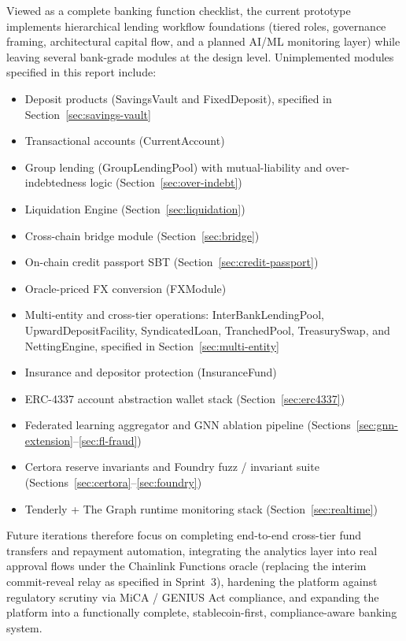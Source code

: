 \documentclass[12pt,a4paper]{report}
\begin{document}
Viewed as a complete banking function checklist, the current prototype implements hierarchical lending workflow foundations (tiered roles, governance framing, architectural capital flow, and a planned AI/ML monitoring layer) while leaving several bank-grade modules at the design level. Unimplemented modules specified in this report include:
\begin{itemize}[noitemsep]
\item Deposit products (SavingsVault and FixedDeposit), specified in Section~\ref{sec:savings-vault}
\item Transactional accounts (CurrentAccount)
\item Group lending (GroupLendingPool) with mutual-liability and over-indebtedness logic (Section~\ref{sec:over-indebt})
\item Liquidation Engine (Section~\ref{sec:liquidation})
\item Cross-chain bridge module (Section~\ref{sec:bridge})
\item On-chain credit passport SBT (Section~\ref{sec:credit-passport})
\item Oracle-priced FX conversion (FXModule)
\item Multi-entity and cross-tier operations: InterBankLendingPool, UpwardDepositFacility, SyndicatedLoan, TranchedPool, TreasurySwap, and NettingEngine, specified in Section~\ref{sec:multi-entity}
\item Insurance and depositor protection (InsuranceFund)
\item ERC-4337 account abstraction wallet stack (Section~\ref{sec:erc4337})
\item Federated learning aggregator and GNN ablation pipeline (Sections~\ref{sec:gnn-extension}--\ref{sec:fl-fraud})
\item Certora reserve invariants and Foundry fuzz / invariant suite (Sections~\ref{sec:certora}--\ref{sec:foundry})
\item Tenderly + The Graph runtime monitoring stack (Section~\ref{sec:realtime})
\end{itemize}
Future iterations therefore focus on completing end-to-end cross-tier fund transfers and repayment automation, integrating the analytics layer into real approval flows under the Chainlink Functions oracle (replacing the interim commit-reveal relay as specified in Sprint~3), hardening the platform against regulatory scrutiny via MiCA / GENIUS Act compliance, and expanding the platform into a functionally complete, stablecoin-first, compliance-aware banking system.
\end{document}
